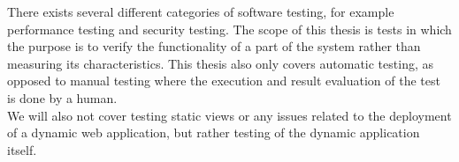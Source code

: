 There exists several different categories of software testing, for
example performance testing and security testing. The scope of this
thesis is tests in which the purpose is to verify the functionality of a
part of the system rather than measuring its characteristics. This thesis
also only covers automatic testing, as opposed to manual testing where
the execution and result evaluation of the test is done by a human.\\

We will also not cover testing static views or any issues related to the
deployment of a dynamic web application, but rather testing of the
dynamic application itself.
